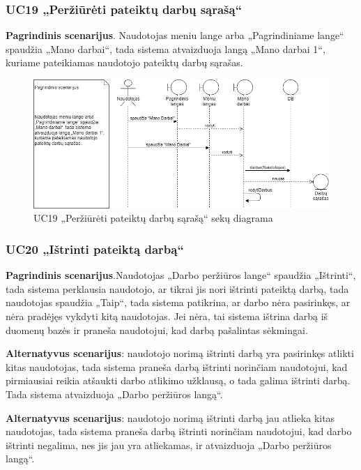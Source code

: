 \documentclass{VUMIFPSbakalaurinis}
\begin{document}
\subsubsection{UC19 „Peržiūrėti pateiktų darbų sąrašą“}
\textbf{Pagrindinis scenarijus}. Naudotojas meniu lange arba „Pagrindiniame lange“ spaudžia „Mano darbai“, tada sistema atvaizduoja langą „Mano darbai 1“, kuriame pateikiamas naudotojo pateiktų darbų sąrašas.

\begin{figure}[H]
	\centering
	\includegraphics[scale=0.6]{img/Sequence/SD19}
	\caption{UC19 „Peržiūrėti pateiktų darbų sąrašą“ sekų diagrama}
	\label{img:uc19seq}
\end{figure}

\subsubsection{UC20 „Ištrinti pateiktą darbą“}
\textbf{Pagrindinis scenarijus}.Naudotojas „Darbo peržiūros lange“ spaudžia „Ištrinti“, tada sistema perklausia naudotojo, ar tikrai jis nori ištrinti pateiktą darbą, tada naudotojas spaudžia „Taip“, tada sistema patikrina, ar darbo nėra pasirinkęs, ar nėra pradėjęs vykdyti kitą naudotojas. Jei nėra, tai sistema ištrina darbą iš duomenų bazės ir praneša naudotojui, kad darbą pašalintas sėkmingai.
\par \textbf{Alternatyvus scenarijus}: naudotojo norimą ištrinti darbą yra pasirinkęs atlikti kitas naudotojas, tada sistema praneša darbą ištrinti norinčiam naudotojui, kad pirmiausiai reikia atšaukti darbo atlikimo užklausą, o tada galima ištrinti darbą. Tada sistema atvaizduoja „Darbo peržiūros langą“.
\par \textbf{Alternatyvus scenarijus}: naudotojo norimą ištrinti darbą jau atlieka kitas naudotojas, tada sistema praneša darbą ištrinti norinčiam naudotojui, kad darbo ištrinti negalima, nes jis jau yra atliekamas, ir atvaizduoja „Darbo peržiūros langą“.
\end{document}

